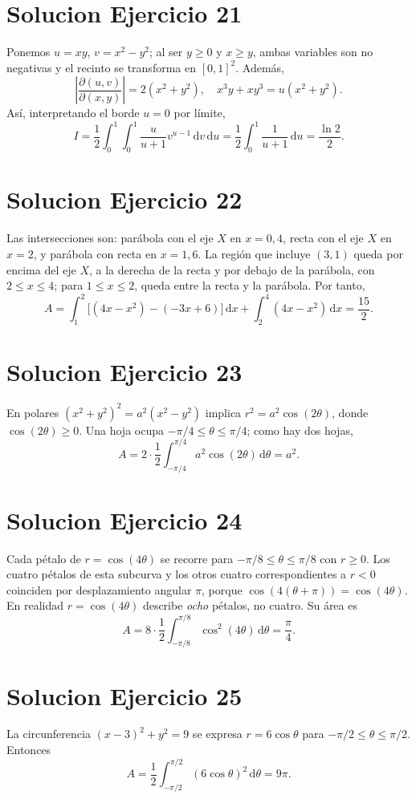 \documentclass[11pt,a4paper]{article}
\newcommand{\dd}{\,\mathrm{d}}
\begin{document}
\section{Solucion Ejercicio 21}
Ponemos $u=xy$, $v=x^2-y^2$; al ser $y\ge0$ y $x\ge y$, ambas variables son no negativas y el recinto se transforma en $[0,1]^2$. Además,
\[\left|\frac{\partial(u,v)}{\partial(x,y)}\right|=2(x^2+y^2),\quad x^3y+xy^3=u(x^2+y^2).\]
Así, interpretando el borde $u=0$ por límite,
\[I=\frac12\int_0^1\int_0^1\frac{u}{u+1}v^{u-1}\dd v\dd u=\frac12\int_0^1\frac1{u+1}\dd u=\boxed{\frac{\ln2}{2}}.\]

\section{Solucion Ejercicio 22}
Las intersecciones son: parábola con el eje $X$ en $x=0,4$, recta con el eje $X$ en $x=2$, y parábola con recta en $x=1,6$. La región que incluye $(3,1)$ queda por encima del eje $X$, a la derecha de la recta y por debajo de la parábola, con $2\le x\le4$; para $1\le x\le2$, queda entre la recta y la parábola. Por tanto,
\[A=\int_1^2\bigl[(4x-x^2)-(-3x+6)\bigr]\dd x+\int_2^4(4x-x^2)\dd x=\boxed{\frac{15}{2}}.\]

\section{Solucion Ejercicio 23}
En polares $(x^2+y^2)^2=a^2(x^2-y^2)$ implica $r^2=a^2\cos(2\theta)$, donde $\cos(2\theta)\ge0$. Una hoja ocupa $-\pi/4\le\theta\le\pi/4$; como hay dos hojas,
\[A=2\cdot\frac12\int_{-\pi/4}^{\pi/4}a^2\cos(2\theta)\dd\theta=\boxed{a^2}.\]

\section{Solucion Ejercicio 24}
Cada pétalo de $r=\cos(4\theta)$ se recorre para $-\pi/8\le\theta\le\pi/8$ con $r\ge0$. Los cuatro pétalos de esta subcurva y los otros cuatro correspondientes a $r<0$ coinciden por desplazamiento angular $\pi$, porque $\cos(4(\theta+\pi))=\cos(4\theta)$. En realidad $r=\cos(4\theta)$ describe \emph{ocho} pétalos, no cuatro. Su área es
\[A=8\cdot\frac12\int_{-\pi/8}^{\pi/8}\cos^2(4\theta)\dd\theta=\boxed{\frac\pi4}.\]

\section{Solucion Ejercicio 25}
La circunferencia $(x-3)^2+y^2=9$ se expresa $r=6\cos\theta$ para $-\pi/2\le\theta\le\pi/2$. Entonces
\[A=\frac12\int_{-\pi/2}^{\pi/2}(6\cos\theta)^2\dd\theta=\boxed{9\pi}.\]
\end{document}
